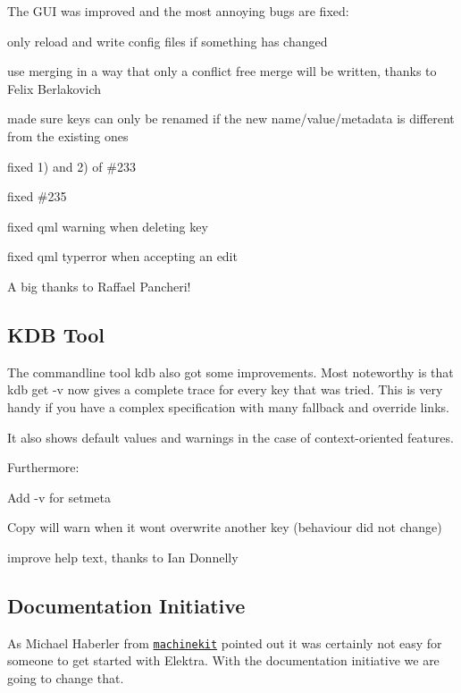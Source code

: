 The G\+UI was improved and the most annoying bugs are fixed\+:


\begin{DoxyItemize}
\item only reload and write config files if something has changed
\item use merging in a way that only a conflict free merge will be written, thanks to Felix Berlakovich
\item made sure keys can only be renamed if the new name/value/metadata is different from the existing ones
\item fixed 1) and 2) of \#233
\item fixed \#235
\item fixed qml warning when deleting key
\item fixed qml typerror when accepting an edit
\end{DoxyItemize}

A big thanks to Raffael Pancheri!

\subsection*{K\+DB Tool}

The commandline tool {\ttfamily kdb} also got some improvements. Most noteworthy is that {\ttfamily kdb get -\/v} now gives a complete trace for every key that was tried. This is very handy if you have a complex specification with many fallback and override links.

It also shows default values and warnings in the case of context-\/oriented features.

Furthermore\+:


\begin{DoxyItemize}
\item Add {\ttfamily -\/v} for setmeta
\item Copy will warn when it won\textquotesingle{}t overwrite another key (behaviour did not change)
\item improve help text, thanks to Ian Donnelly
\end{DoxyItemize}

\subsection*{Documentation Initiative}

As Michael Haberler from \href{http://www.machinekit.io/}{\tt machinekit} pointed out it was certainly not easy for someone to get started with Elektra. With the documentation initiative we are going to change that.


